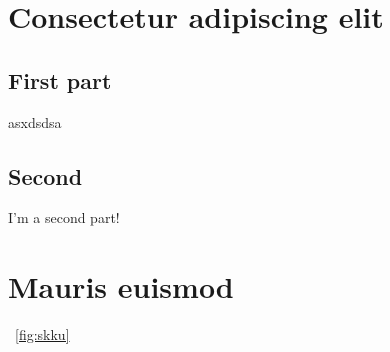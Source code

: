 





\begin{appendices}
  \chapter{Consectetur adipiscing elit}
  \section{First part}
  asxdsdsa
  \section{Second}
  I'm a second part!
  \chapter{Mauris euismod}
  ~\ref{fig:skku}
\end{appendices}
